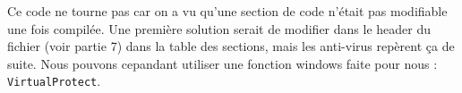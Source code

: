 \documentclass[a4paper,10pt]{article}
\begin{document}
Ce code ne tourne pas car on a vu qu'une section de code n'était pas modifiable une fois compilée. Une première solution serait de modifier dans le header du fichier (voir partie 7) dans la table des sections, mais les anti-virus repèrent ça de suite. Nous pouvons cepandant utiliser une fonction windows faite pour nous : \texttt{VirtualProtect}.
\end{document}

